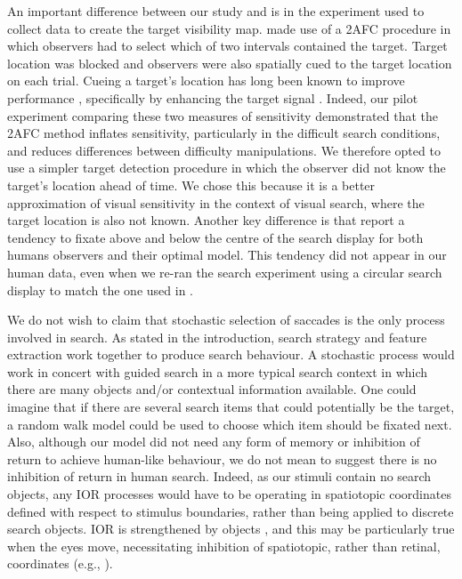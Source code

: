 \documentclass[man]{apa6}
\begin{document}
An important difference between our study and \textcite{najemnik-geisler2005, najemnik-geisler2008} is in the experiment used to collect data to create the
target visibility map. \textcite{najemnik-geisler2005, najemnik-geisler2008} made
use of a 2AFC procedure in which observers had to select which of two
intervals contained the target. Target location was blocked and observers were
also spatially cued to the target location on each trial. Cueing a target's
location has long been known to improve performance \parencite{posner1980},
specifically by enhancing the target signal \parencite{yeshurun1998}. Indeed, our pilot experiment comparing these two measures of sensitivity demonstrated that the 2AFC method inflates sensitivity, particularly in the difficult search conditions, and reduces differences between difficulty manipulations. We therefore
opted to use a simpler target detection procedure in which the observer did
not know the target's location ahead of time. We chose this because it is a
better approximation of visual sensitivity in the context of visual search,
where the target location is also not known. Another key difference is that \textcite{najemnik-geisler2008} report a
tendency to fixate above and below the centre of the search display for both
humans observers and their optimal model. This tendency did not appear in our
human data, even when we re-ran the search experiment using a circular search
display to match the one used in \textcite{najemnik-geisler2008}.  

\par 

We do not wish to claim that stochastic selection of saccades is the only process
involved in search. As stated in the introduction, search strategy and feature
extraction work together to produce search behaviour. A stochastic process
would work in concert with guided search in a more typical search context in
which there are many objects and/or contextual information available. One
could imagine that if there are several search items that could potentially be
the target, a random walk model could be used to choose which item should be
fixated next. Also, although our model did not need any form of memory or
inhibition of return to achieve human-like behaviour, we do not mean to
suggest there is no inhibition of return in human search. Indeed, as our
stimuli contain no search objects, any IOR processes would have to be
operating in spatiotopic coordinates defined with respect to stimulus
boundaries, rather than being applied to discrete search objects. IOR is
strengthened by objects \parencite{jordan1998}, and this may be particularly true
when the eyes move, necessitating inhibition of spatiotopic, rather than
retinal, coordinates (e.g., \textcite{kruger2013}).
\end{document}
